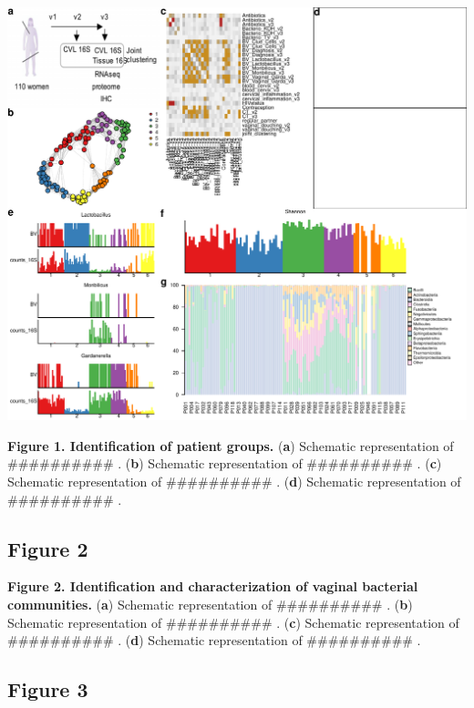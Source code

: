 \documentclass[
]{article}
\begin{document}
\includegraphics[width=1\linewidth]{manuscript_template_files/figure-latex/unnamed-chunk-3-1}

\textbf{Figure 1. Identification of patient groups.}
(\textbf{a}) Schematic representation of \#\#\#\#\#\#\#\#\#\# .
(\textbf{b}) Schematic representation of \#\#\#\#\#\#\#\#\#\# .
(\textbf{c}) Schematic representation of \#\#\#\#\#\#\#\#\#\# .
(\textbf{d}) Schematic representation of \#\#\#\#\#\#\#\#\#\# .

\clearpage

\hypertarget{figure-2}{%
\subsection{Figure 2}\label{figure-2}}

\textbf{Figure 2. Identification and characterization of vaginal bacterial communities.}
(\textbf{a}) Schematic representation of \#\#\#\#\#\#\#\#\#\# .
(\textbf{b}) Schematic representation of \#\#\#\#\#\#\#\#\#\# .
(\textbf{c}) Schematic representation of \#\#\#\#\#\#\#\#\#\# .
(\textbf{d}) Schematic representation of \#\#\#\#\#\#\#\#\#\# .

\clearpage

\hypertarget{figure-3}{%
\subsection{Figure 3}\label{figure-3}}
\end{document}
